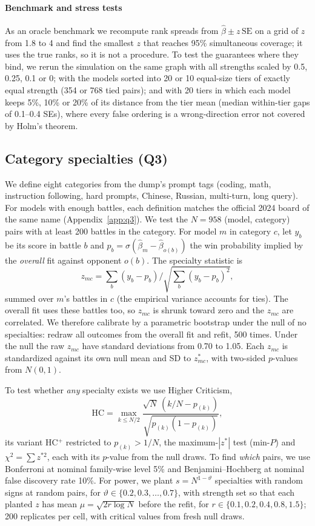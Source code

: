 \documentclass[12pt]{article}
\newcommand{\SE}{\mathrm{SE}}
\newcommand{\hb}{\hat\beta}
\begin{document}
\paragraph{Benchmark and stress tests} As an oracle benchmark we recompute rank spreads from $\hb \pm z\,\SE$ on a grid of $z$ from 1.8 to 4 and find the smallest $z$ that reaches 95\% simultaneous coverage; it uses the true ranks, so it is not a procedure. To test the guarantees where they bind, we rerun the simulation on the same graph with all strengths scaled by 0.5, 0.25, 0.1 or 0; with the models sorted into 20 or 10 equal-size tiers of exactly equal strength (354 or 768 tied pairs); and with 20 tiers in which each model keeps 5\%, 10\% or 20\% of its distance from the tier mean (median within-tier gaps of 0.1--0.4 SEs), where every false ordering is a wrong-direction error not covered by Holm's theorem.

\subsection{Category specialties (Q3)}\label{sec:q3methods}

We define eight categories from the dump's prompt tags (coding, math, instruction following, hard prompts, Chinese, Russian, multi-turn, long query). For models with enough battles, each definition matches the official 2024 board of the same name (Appendix~\ref{app:q3}). We test the $N = 958$ (model, category) pairs with at least 200 battles in the category. For model $m$ in category $c$, let $y_b$ be its score in battle $b$ and $p_b = \sigma(\hb_m - \hb_{o(b)})$ the win probability implied by the \emph{overall} fit against opponent $o(b)$. The specialty statistic is
\[
z_{mc} = \textstyle\sum_b (y_b - p_b) \big/ \sqrt{\sum_b (y_b - p_b)^2},
\]
summed over $m$'s battles in $c$ (the empirical variance accounts for ties). The overall fit uses these battles too, so $z_{mc}$ is shrunk toward zero and the $z_{mc}$ are correlated. We therefore calibrate by a parametric bootstrap under the null of no specialties: redraw all outcomes from the overall fit and refit, 500 times. Under the null the raw $z_{mc}$ have standard deviations from 0.70 to 1.05. Each $z_{mc}$ is standardized against its own null mean and SD to $z^*_{mc}$, with two-sided $p$-values from $N(0,1)$.

To test whether \emph{any} specialty exists we use Higher Criticism,
\[
\mathrm{HC} = \max_{k \le N/2} \frac{\sqrt N\,(k/N - p_{(k)})}{\sqrt{p_{(k)}(1 - p_{(k)})}},
\]
its variant HC$^+$ restricted to $p_{(k)} > 1/N$, the maximum-$|z^*|$ test (min-$P$) and $\chi^2 = \sum z^{*2}$, each with its $p$-value from the null draws. To find \emph{which} pairs, we use Bonferroni at nominal family-wise level 5\% and Benjamini--Hochberg \citep{benjamini1995controlling} at nominal false discovery rate 10\%. For power, we plant $s = N^{1-\vartheta}$ specialties with random signs at random pairs, for $\vartheta \in \{0.2, 0.3, \dots, 0.7\}$, with strength set so that each planted $z$ has mean $\mu = \sqrt{2r\log N}$ before the refit, for $r \in \{0.1, 0.2, 0.4, 0.8, 1.5\}$; 200 replicates per cell, with critical values from fresh null draws.
\end{document}
